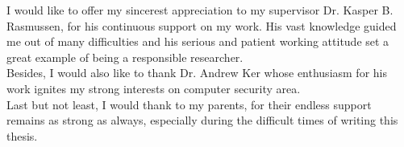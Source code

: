 \begin{acknowledgements}
I would like to offer my sincerest appreciation to my supervisor Dr. Kasper B. Rasmussen, for his continuous support on my work. His vast knowledge guided me out of many difficulties and his serious and patient working attitude set a great example of being a responsible researcher.\\

Besides, I would also like to thank Dr. Andrew Ker whose enthusiasm for his work ignites my strong interests on computer security area.\\
 
Last but not least, I would thank to my parents, for their endless support remains as strong as always, especially during the difficult times of writing this thesis.
\end{acknowledgements}